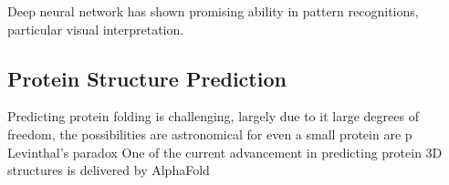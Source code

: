 Deep neural network has shown promising ability in pattern recognitions, particular visual interpretation.
\par 

\subsection{Protein Structure Prediction}
Predicting protein folding is challenging, largely due to it large degrees of freedom, the possibilities are astronomical for even a small protein are p Levinthal's paradox One of the current advancement in predicting protein 3D structures is delivered by AlphaFold